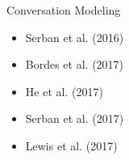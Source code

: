 \begin{frame}
\begin{columns}
\begin{column}{0.4\textwidth}
\begin{overlayarea}{\textwidth}{\textheight}
\begin{block}{Conversation Modeling}
\begin{itemize}
                        \item Serban et al. (2016)\cite{DBLP:journals/corr/SerbanSLCPCB16}
                        \item Bordes et al. (2017)\cite{DBLP:journals/corr/BordesW16}
                        \item He et al. (2017)
                        \item Serban et al. (2017)\cite{DBLP:journals/corr/abs-1709-02349}
                        \item Lewis et al. (2017) 
                    \end{itemize}
                \end{block}
            \end{overlayarea}
        \end{column}
    \end{columns}
\end{frame}

